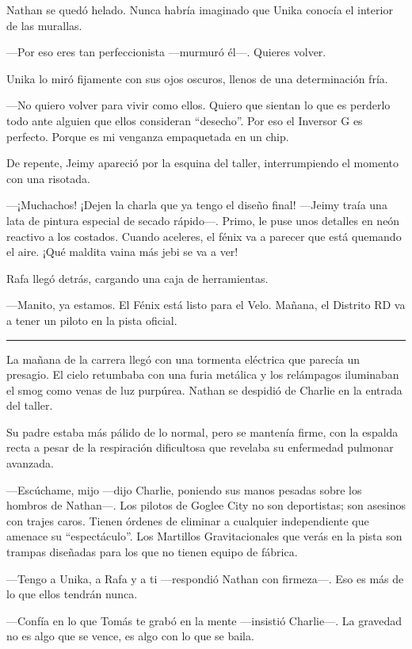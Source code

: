\documentclass[12pt,a4paper]{book}
\begin{document}
Nathan se quedó helado. Nunca habría imaginado que Unika conocía el interior de las murallas.

---Por eso eres tan perfeccionista ---murmuró él---. Quieres volver.

Unika lo miró fijamente con sus ojos oscuros, llenos de una determinación fría.

---No quiero volver para vivir como ellos. Quiero que sientan lo que es perderlo todo ante alguien que ellos consideran ``desecho''. Por eso el Inversor G es perfecto. Porque es mi venganza empaquetada en un chip.

De repente, Jeimy apareció por la esquina del taller, interrumpiendo el momento con una risotada.

---¡Muchachos! ¡Dejen la charla que ya tengo el diseño final! ---Jeimy traía una lata de pintura especial de secado rápido---. Primo, le puse unos detalles en neón reactivo a los costados. Cuando aceleres, el fénix va a parecer que está quemando el aire. ¡Qué maldita vaina más jebi se va a ver!

Rafa llegó detrás, cargando una caja de herramientas.

---Manito, ya estamos. El Fénix está listo para el Velo. Mañana, el Distrito RD va a tener un piloto en la pista oficial.

\bigskip
\noindent\rule{\textwidth}{0.4pt}
\bigskip

La mañana de la carrera llegó con una tormenta eléctrica que parecía un presagio. El cielo retumbaba con una furia metálica y los relámpagos iluminaban el smog como venas de luz purpúrea. Nathan se despidió de Charlie en la entrada del taller. 

Su padre estaba más pálido de lo normal, pero se mantenía firme, con la espalda recta a pesar de la respiración dificultosa que revelaba su enfermedad pulmonar avanzada.

---Escúchame, mijo ---dijo Charlie, poniendo sus manos pesadas sobre los hombros de Nathan---. Los pilotos de Goglee City no son deportistas; son asesinos con trajes caros. Tienen órdenes de eliminar a cualquier independiente que amenace su ``espectáculo''. Los Martillos Gravitacionales que verás en la pista son trampas diseñadas para los que no tienen equipo de fábrica.

---Tengo a Unika, a Rafa y a ti ---respondió Nathan con firmeza---. Eso es más de lo que ellos tendrán nunca.

---Confía en lo que Tomás te grabó en la mente ---insistió Charlie---. La gravedad no es algo que se vence, es algo con lo que se baila.
\end{document}
